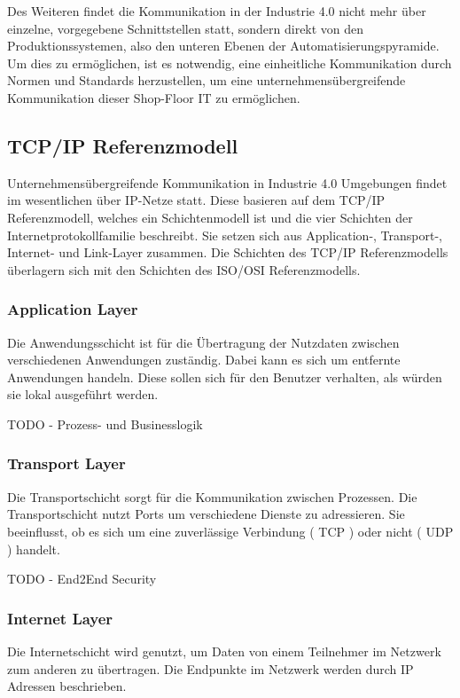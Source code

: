 Des Weiteren findet die Kommunikation in der Industrie 4.0 nicht mehr über einzelne, vorgegebene Schnittstellen statt, sondern direkt von den Produktionssystemen, also den unteren Ebenen der Automatisierungspyramide. Um dies zu ermöglichen, ist es notwendig, eine einheitliche Kommunikation durch Normen und Standards herzustellen, um eine unternehmensübergreifende Kommunikation dieser Shop-Floor IT zu ermöglichen. 

\subsection{TCP/IP Referenzmodell}
\label{Grundlagen:TCP/IP Referenzmodell}
Unternehmensübergreifende Kommunikation in Industrie 4.0 Umgebungen findet im wesentlichen über IP-Netze statt. Diese basieren auf dem TCP/IP Referenzmodell, welches ein Schichtenmodell ist und die vier Schichten der Internetprotokollfamilie beschreibt. Sie setzen sich aus Application-, Transport-, Internet- und Link-Layer zusammen. Die Schichten des TCP/IP Referenzmodells überlagern sich mit den Schichten des ISO/OSI Referenzmodells. 

\subsubsection{Application Layer}
Die Anwendungsschicht ist für die Übertragung der Nutzdaten zwischen verschiedenen Anwendungen zuständig. Dabei kann es sich um entfernte Anwendungen handeln. Diese sollen sich für den Benutzer verhalten, als würden sie lokal ausgeführt werden.

TODO - Prozess- und Businesslogik

\subsubsection{Transport Layer}
Die Transportschicht sorgt für die Kommunikation zwischen Prozessen. Die Transportschicht nutzt Ports um verschiedene Dienste zu adressieren. Sie beeinflusst, ob es sich um eine zuverlässige Verbindung ( TCP ) oder nicht ( UDP ) handelt.

TODO - End2End Security

\subsubsection{Internet Layer}
Die Internetschicht wird genutzt, um Daten von einem Teilnehmer im Netzwerk zum anderen zu übertragen. Die Endpunkte im Netzwerk werden durch IP Adressen beschrieben.

